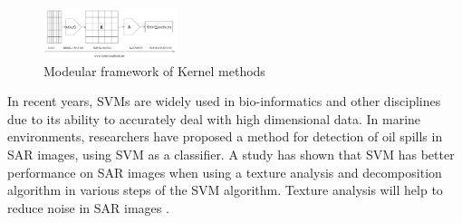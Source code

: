 
\begin{figure}[H]
	\centering
    \includegraphics[width=0.35\textwidth]{./img/kernel1.png}
     \caption{\footnotesize{Modeular framework of Kernel methods }}
    \label{fig:Kernel}
\end{figure} 



In recent years, SVMs are widely used in bio-informatics \cite{furey2000support,osuna1997training,guyon2002gene} and other disciplines due to its ability to accurately deal with high dimensional data\cite{joachims1998text}. In marine environments, researchers have proposed a method for detection of oil spills in SAR images, using SVM as a classifier. A study has shown that SVM has better performance on SAR images when using a texture analysis and decomposition algorithm in various steps of the SVM algorithm. Texture analysis will help to reduce noise in SAR images \cite{matkan2013oil}.



